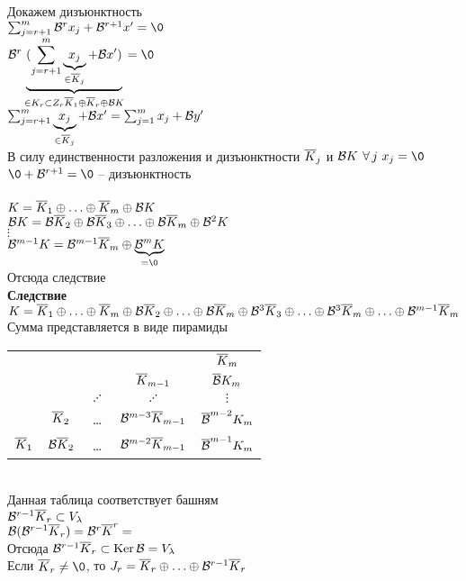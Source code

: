 \documentclass[12pt]{article}
\begin{document}
Докажем дизъюнктность\\
$\sum_{j=r+1}^m \mcB^r x_j +\mcB^{r+1}x' = \0$\\
$\mcB^r\ub{\in K_r \subset Z_r \ol K_1 \oplus \ol K_r  \oplus \mcB K}{(\sum_{j=r+1}^m \ub{\in \ol K_j}{x_j} + \mcB x')}=\0$\\
$\sum_{j=r+1}^m \ub{\in \ol K_j}{x_j} + \mcB x' = \sum_{j=1}^m x_j + \mcB y'$\\
В силу единственности разложения и дизъюнктности $\ol K_j$ и $\mcB K$ $\fall j\ x_j = \0$\\
$\0 + \mcB^{r+1} = \0$ -- дизъюнктность\\\\
$K = \ol K_1 \oplus \ldots \oplus \ol K_m \oplus \mcB K$\\
$\mcB K = \mcB \ol K_2 \oplus \mcB \ol K_3 \oplus \ldots \oplus \mcB \ol K_m \oplus \mcB^2 K$\\
$\vdots$\\
$\mcB^{m-1}K = \mcB^{m-1}\ol K_m \oplus \ub{=\0}{\mcB^m K}$\\
Отсюда следствие\\
\textbf{Следствие}\\
$K = \ol K_1 \oplus \ldots \oplus \ol K_m \oplus \mcB \ol K_2 \oplus \ldots \oplus \mcB\ol K_m \oplus \mcB^3 \ol K_3 \oplus \ldots \oplus \mcB^3 \ol K_m \oplus \ldots \oplus \mcB^{m-1}\ol K_m$\\
Сумма представляется в виде пирамиды\\
\begin{tabular}{ccccc}
     & & & & $\ol K_m$\\
     & & & $\ol K_{m-1}$ & $\ol \mcB K_m$\\
     & & $\iddots$ & $\iddots$ & $\vdots$\\
     & $\ol K_2$ & \ldots & $\mcB^{m-3}\ol K_{m-1}$ & $\ol \mcB^{m-2} K_m$\\
     $\ol K_1$ & $\mcB \ol K_2$ & \ldots & $\mcB^{m-2}\ol K_{m-1}$ & $\ol \mcB^{m-1} K_m$\\
\end{tabular}\\
Данная таблица соответствует башням\\
$\mcB^{r-1}\ol K_r \subset V_\lambda$\\
$\mcB (\mcB^{r-1}\ol K_r) = \mcB^r \ol K^r = \-$\\
Отсюда $\mcB^{r-1}\ol K_r \subset \ker \mcB = V_\lambda$\\
Если $\ol K_r \neq \0$, то $J_r = \ol K_r \oplus \ldots \oplus \mcB^{r-1} \ol K_r$\\
\end{document}
